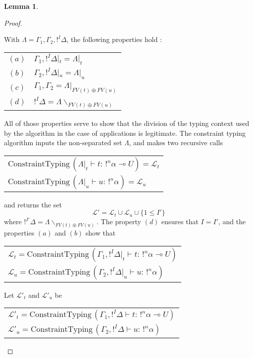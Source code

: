 \documentclass[9pt]{article}
\theoremstyle{plain}
\theoremstyle{definition}
\newtheorem{lemma}{Lemma}[section]
\begin{document}
\begin{lemma}
\begin{proof}
\begin{itemize}
				With $\Lambda = \Gamma_1, \Gamma_2, !^I \Delta$, the following properties hold :
					\begin{center}
					\begin{tabular}{cl}
						$(a)$ & $ \Gamma_1, !^I\Delta|_t = \Lambda |_t $ \\
						$(b)$ & $ \Gamma_2, !^I\Delta|_u = \Lambda |_u $	\\
						$(c)$ & $ \Gamma_1, \Gamma_2 = \Lambda |_{FV(t) \oplus FV(u)} $ \\
						$(d)$ & $ !^I \Delta = \Lambda \backslash_{FV(t) \oplus FV(u)} $
					\end{tabular}
					\end{center}
			 	All of those properties serve to show that the division of the typing context used by the algorithm in the case of applications
			 	is legitimate. The constraint typing algorithm inputs the non-separated set $\Lambda$, and makes two recursive calls
			 		\begin{center}
			 		\begin{tabular}{l}
			 			$\text{ConstraintTyping} \, (\Lambda |_t \vdash t : \, !^n\alpha \multimap U) = \mathcal{L}_t$ \\
			 			$\text{ConstraintTyping} \, (\Lambda |_u \vdash u : \, !^n\alpha) = \mathcal{L}_u$
			 		\end{tabular}
			 		\end{center}
			 	and returns the set
			 		$$ \mathcal{L'} = \mathcal{L}_t \cup \mathcal{L}_u \cup \{ 1 \le I' \} $$
			 	where $!^{I'} \Delta = \Lambda \backslash_{FV(t) \oplus FV(u)}$.
			 	The property $(d)$ ensures that $I = I'$, and the properties $(a)$ and $(b)$ show that
			 		\begin{center}
			 		\begin{tabular}{l}
			 			$\mathcal{L}_t = \text{ConstraintTyping} \, (\Gamma_1, !^I \Delta |_t \vdash t : \, !^n\alpha \multimap U)$ \\
			 			$\mathcal{L}_u = \text{ConstraintTyping} \, (\Gamma_2, !^I \Delta |_u \vdash u : \, !^n\alpha)$
			 		\end{tabular}
			 		\end{center}
			 	Let $\mathcal{L'}_t$ and $\mathcal{L'}_u$ be
			 		\begin{center}
			 		\begin{tabular}{l}
			 			$\mathcal{L'}_t = \text{ConstraintTyping} \, (\Gamma_1, !^I \Delta \vdash t : \, !^n\alpha \multimap U)$ \\
			 			$\mathcal{L'}_u = \text{ConstraintTyping} \, (\Gamma_2, !^I \Delta \vdash u : \, !^n\alpha)$

\end{tabular}
\end{center}
\end{itemize}
\end{proof}
\end{lemma}
\end{document}
